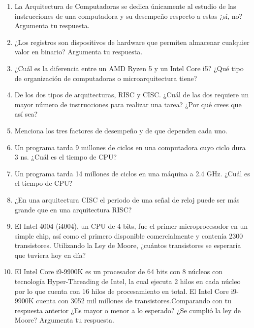 \documentclass[a4paper,12pt]{article}
\begin{document}
\begin{enumerate}
        \item La Arquitectura de Computadoras se dedica  únicamente al estudio de las instrucciones de una computadora y su desempeño respecto a estas ¿sí, no? Argumenta tu respuesta.
        \item ¿Los registros son dispositivos de hardware que permiten almacenar cualquier valor en binario? Argumenta tu respuesta.
        \item ¿Cuál es la diferencia entre un AMD Ryzen 5 y un Intel Core i5? ¿Qué tipo de organización de computadoras o microarquitectura tiene?
        \item De los dos tipos de arquitecturas, RISC y CISC. ¿Cuál de las dos requiere un mayor número de instrucciones para realizar una tarea? ¿Por qué crees que así sea?
        \item Menciona los tres factores de desempeño y de que dependen cada uno.
        \item Un programa tarda 9 millones de ciclos en una computadora cuyo ciclo dura 3 ns. ¿Cuál es el tiempo de CPU?
        \item Un programa tarda 14 millones de ciclos en una máquina a 2.4 GHz. ¿Cuál es el tiempo de CPU?
        \item ¿En una arquitectura CISC el periodo de una señal de reloj puede ser más grande que en una  arquitectura RISC?
        \item El Intel 4004 (i4004), un CPU de 4 bits, fue el primer microprocesador en un simple chip, así como el primero disponible comercialmente y contenía 2300 transistores. Utilizando la Ley de Moore, ¿cuántos transistores se esperaría que tuviera hoy en día?     
        \item El Intel Core i9-9900K es un procesador de 64 bits con 8 núcleos con tecnología Hyper-Threading de Intel, la cual ejecuta 2 hilos en cada núcleo por lo que cuenta con 16 hilos de procesamiento en total. El Intel Core i9-9900K cuenta con 3052 mil millones de transistores.Comparando con tu respuesta anterior ¿Es mayor o menor a lo esperado? ¿Se cumplió la ley de Moore? Argumenta tu respuesta.



            
    
\end{enumerate}


\nocite{*}
\printbibliography
\end{document}
